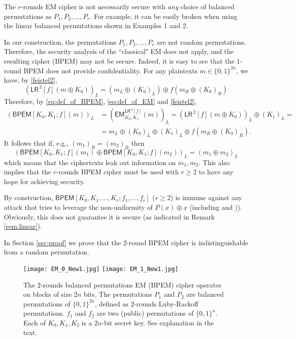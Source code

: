 \documentclass{llncs}
\newcommand{\s}{\{0,1\}}
\newcommand{\tx}{\textsf}
\begin{document}
\begin{remark}
\label{rem:linear}
The $r$-rounds EM cipher is not necessarily secure with {\it any} choice of balanced permutations as $P_1,P_2,\ldots,P_r$. For example, it can be easily broken when using the linear balanced permutations shown in Examples 1 and 2.
\end{remark}

\begin{remark}\label{rem:2LR}
In our construction, the permutations $P_1,P_2,\ldots,P_r$ are not random permutations. Therefore, the security analysis of the ``classical" EM does not apply, and the resulting cipher (BPEM) may not be secure. Indeed, it is easy to see that the $1$-round BPEM does not provide confidentiality. For any plaintexts $m\in\s^{2n}$, we have, by \eqref{feistel2},
$$\left(\tx{LR}^{\,2}[f](m\oplus K_0)\right)_L=\left(m_L\oplus (K_0)_L\right)\oplus f(m_R\oplus (K_0)_R)$$
Therefore, by \eqref{eq:def_of_BPEM}, \eqref{eq:def_of_EM} and \eqref{feistel2},
\begin{align*}\left(\tx{BPEM}[K_0,K_1;f](m)\right)_L&= \left(\tx{EM}^{\tx{LR}^{\,2}[f]}_{K_0,K_1}(m)\right)_L=\left(\tx{LR}^{\,2}[f](m\oplus K_0)\right)_L\oplus (K_1)_L = \\
&= m_L\oplus(K_0)_L\oplus(K_1)_L\oplus f(m_R\oplus (K_0)_R).
\end{align*}
It follows that if, e.g., $(m_1)_R=(m_2)_R$ then
$$\left(\tx{BPEM}[K_0,K_1;f](m_1)\oplus\tx{BPEM}[K_0,K_1;f](m_2)\right)_L=(m_1\oplus m_2)_L$$ which means that the ciphertexts leak out information on $m_1,m_2$.
This also implies that the $r$-rounds BPEM cipher must be used with $r \ge2$ to have any hope for achieving security.
\end{remark}

\begin{remark}\label{rem:immune}
By construction, $\tx{BPEM}[K_0,K_1, \ldots, K_r;f_1, \ldots, f_r]$ ($r \ge 2$) is immune
against any attack that tries to leverage the non-uniformity of $P(x) \oplus x$ (including \cite{NWW} and \cite{DDKS})). Obviously, this does not guarantee it is secure (as indicated in Remark \ref{rem:linear}).
\end{remark}

In Section \ref{sec:proof} we prove that the $2$-round BPEM cipher is indistinguishable from a random permutation.

\begin{figure}[ht!]
\centering
\texttt{[image: EM\_0\_New1.jpg]}
\texttt{[image: EM\_1\_New1.jpg]}
\vspace{-1.5cm}
\caption{The $2$-rounds balanced permutations EM (BPEM) cipher operates on blocks of size $2n$ bits.
The permutations $P_1$ and $P_2$ are balanced permutations of $\{0, 1\}^{2n}$, defined as $2$-rounds Luby-Rackoff permutations. $f_1$ and $f_2$ are two (public) permutations of $\{ 0, 1 \}^{n}$.
Each of $K_0,K_1,K_2$ is a $2n$-bit secret key. See explanation in the text.}
\label{2rEM}
\end{figure}
\end{document}
